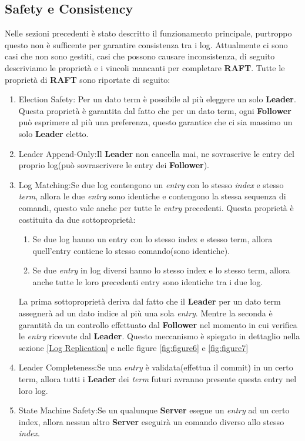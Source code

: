 \subsection{Safety e Consistency}
Nelle sezioni precedenti è stato descritto il funzionamento principale, purtroppo questo non è sufficente per garantire consistenza tra i log.
Attualmente ci sono casi che non sono gestiti, casi che possono causare inconsistenza, di seguito descriviamo le proprietà e i vincoli mancanti per completare \textbf{RAFT}.
Tutte le proprietà di \textbf{RAFT} sono riportate di seguito:
\begin{enumerate}
	\item Election Safety: Per un dato term è possibile al più eleggere un solo \textbf{Leader}.
	Questa proprietà è garantita dal fatto che per un dato term, ogni \textbf{Follower} può esprimere al più una preferenza, questo garantice che ci sia massimo un solo \textbf{Leader} eletto.
	\item Leader Append-Only:Il \textbf{Leader} non cancella mai, ne sovrascrive le entry del proprio log(può sovrascrivere le entry dei \textbf{Follower}).
	\item Log Matching:Se due log contengono un \textit{entry} con lo stesso \textit{index} e stesso \textit{term}, allora le due \textit{entry} sono identiche e contengono la stessa sequenza di comandi, questo vale anche per tutte le \textit{entry} precedenti.
	Questa proprietà è costituita da due sottoproprietà:
	\begin{enumerate}
		\item Se due log hanno un entry con lo stesso index e stesso term, allora quell'entry contiene lo stesso comando(sono identiche).
		\item Se due \textit{entry} in log diversi hanno lo stesso index e lo stesso term, allora anche tutte le loro precedenti entry sono identiche tra i due log.
	\end{enumerate}
	La prima sottoproprietà deriva dal fatto che il \textbf{Leader} per un dato term assegnerà ad un dato indice al più una sola \textit{entry}.
	Mentre la seconda è garantità da un controllo effettuato dal \textbf{Follower} nel momento in cui verifica le \textit{entry} ricevute dal \textbf{Leader}.
	Questo meccanismo è spiegato in dettaglio nella sezione \ref{Log Replication} e nelle figure  \ref{fig:figure6} e \ref{fig:figure7}
	\item Leader Completeness:Se una \textit{entry} è validata(effettua il commit) in un certo term, allora tutti i \textbf{Leader} dei \textit{term} futuri avranno presente questa entry nel loro log.
	\item State Machine Safety:Se un qualunque \textbf{Server} esegue un \textit{entry} ad un certo index, allora nessun altro \textbf{Server} eseguirà un comando diverso allo stesso \textit{index}.
\end{enumerate}
